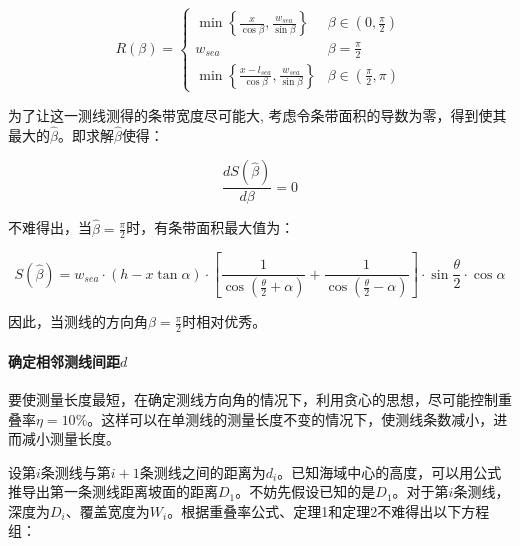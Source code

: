 \begin{equation}
    R(\beta) =
    \begin{cases}
        \min \left \{
        \frac{x}{\cos \beta},
        \frac{w_{sea}}{\sin \beta}
        \right \}
                & \beta \in \left(0, \frac{\pi}{2} \right)   \\
        w_{sea} & \beta = \frac{\pi}{2}                      \\
        \min \left \{
        \frac{x - l_{sea}}{\cos \beta},
        \frac{w_{sea}}{\sin \beta}
        \right \}
                & \beta \in \left(\frac{\pi}{2}, \pi \right)
    \end{cases}
\end{equation}

为了让这一测线测得的条带宽度尽可能大, 考虑令条带面积的导数为零，得到使其最大的$\hat \beta$。即求解$\hat \beta$使得：

\begin{equation}
    \frac{dS(\hat \beta)}{d\beta} = 0
\end{equation}

不难得出，当$\hat \beta = \frac{\pi}{2}$时，有条带面积最大值为：

\begin{equation}
    S(\hat \beta) =
    w_{sea} \cdot (h - x\tan \alpha) \cdot \left[
        \frac{1}{\cos \left(
            \frac{\theta}{2} + \alpha
            \right)} + \frac{1}{\cos \left(
            \frac{\theta}{2} - \alpha
            \right)}
        \right]\cdot \sin \frac{\theta}{2} \cdot \cos \alpha
\end{equation}

因此，当测线的方向角$\beta = \frac{\pi}{2}$时相对优秀。

\paragraph{确定相邻测线间距$d$}

要使测量长度最短，在确定测线方向角的情况下，利用贪心的思想，尽可能控制重叠率$\eta = 10\%$。这样可以在单测线的测量长度不变的情况下，使测线条数减小，进而减小测量长度。

设第$i$条测线与第$i + 1$条测线之间的距离为$d_i$。已知海域中心的高度，可以用公式推导出第一条测线距离坡面的距离$D_1$。不妨先假设已知的是$D_1$。对于第$i$条测线，深度为$D_i$、覆盖宽度为$W_i$。根据重叠率公式、定理1和定理2不难得出以下方程组：

